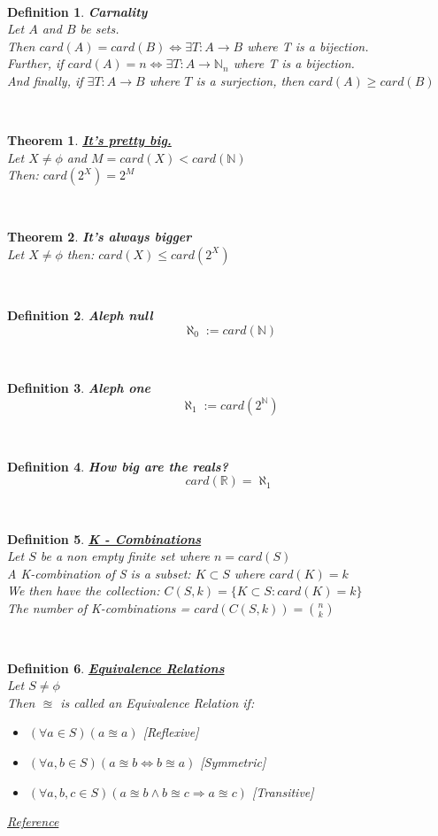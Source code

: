 \documentclass[12pt]{extarticle}
\theoremstyle{plain}
\newtheorem{thm}{Theorem}[section]
\theoremstyle{plain}
\theoremstyle{plain}
\theoremstyle{Definition}
\newtheorem{def.}{Definition}[section]
\theoremstyle{Definition}
\theoremstyle{plain}
\theoremstyle{plain}
\newcommand{\cut}[0]{\noindent\framebox[\linewidth]{\rule{\linewidth}{2pt}}\\}
\begin{document}
\cut
\begin{def.} \textbf{Carnality} \\ 
	Let $A$ and $B$ be sets. \\ 
	Then $card(A) = card(B) \Leftrightarrow \exists T : A \to B$ where T is a bijection. \\ 
	Further, if $card(A) = n \Leftrightarrow \exists T : A \to \mathbb{N}_n$ where T is a bijection. \\
	And finally, if $\exists T : A \to B$ where $T$ is a surjection, then $card(A) \geq card(B)$ 
\end{def.}
\cut
\begin{thm} \underline{\textbf{It's pretty big.}} \\ 
	Let $X \not = \phi$ and $M = card(X) < card(\mathbb{N})$ \\
	Then: $card(2^X) = 2^M$ 
\end{thm}
\cut
\begin{thm} \textbf{It's always bigger} \\ 
	Let $X \not = \phi$ then: $card(X) \leq card(2^X)$ 
\end{thm}
\cut 
\begin{def.} \textbf{Aleph null} 
	$$\aleph_0 := card(\mathbb{N})$$ 
\end{def.}
\cut
\begin{def.} \textbf{Aleph one} 
	$$\aleph_1 := card(2^\mathbb{N})$$
\end{def.}
\cut
\begin{def.} \textbf{How big are the reals?}
	$$card(\mathbb{R}) = \aleph_1$$
\end{def.}
\cut
\begin{def.} \underline{\textbf{K - Combinations}} \\
	Let $S$ be a non empty finite set where $n = card(S)$ \\ 
	A K-combination of S is a subset: $K \subset S$ where $card(K) = k$ \\ 
	We then have the collection: $C(S,k) = \{K \subset S : card(K) = k\}$ \\
	The number of K-combinations = $card(C(S,k)) = \binom{n}{k}$
\end{def.}
\cut
\begin{def.} \underline{\textbf{Equivalence Relations}} \\
	Let $S \not = \phi$ \\ 
	Then $\approxeq$ is called an Equivalence Relation if: 
	\begin{itemize}
		\item $(\forall a \in S)(a \approxeq a)$ \hfill [Reflexive]
		\item $(\forall a,b \in S)(a \approxeq b \Leftrightarrow b \approxeq a)$ \hfill [Symmetric]
		\item $(\forall a,b,c \in S)(a \approxeq b \wedge b \approxeq c \Rightarrow a \approxeq c)$ \hfill [Transitive] 
	\end{itemize}
\href{https://en.wikipedia.org/wiki/Equivalence_relation}{Reference}
\end{def.}
\end{document}
